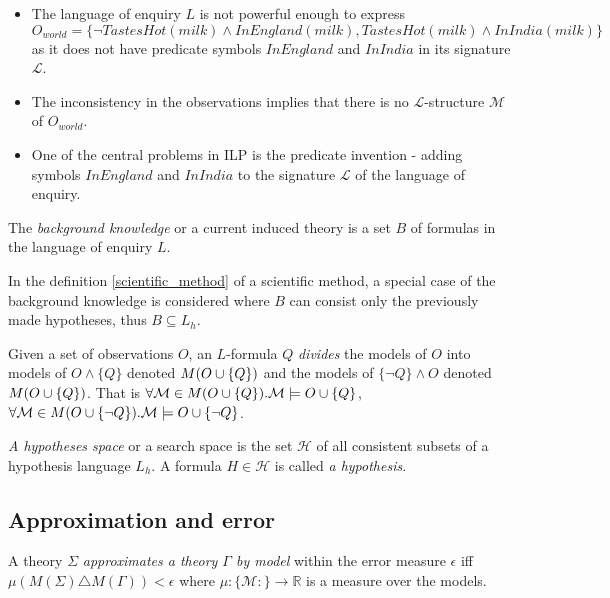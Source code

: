 \begin{remark}
\begin{itemize}
\item The language of enquiry $L$ is not powerful enough to express $O_{world}=\{\neg TastesHot(milk) \land InEngland(milk), TastesHot(milk) \land InIndia(milk)\}$
 as it does not have predicate symbols $InEngland$ and $InIndia$ in its signature $\mathcal{L}$.
\item The inconsistency in the observations implies that there is no $\mathcal{L}$-structure $\mathcal{M}$ of $O_{world}$.
\item One of the central problems in ILP is the predicate invention - adding symbols $InEngland$ and $InIndia$ to the signature $\mathcal{L}$ of the language of enquiry.
\end{itemize}
\end{remark}

\begin{defn}
The \emph{background knowledge} or a current induced theory is a set $B$ of formulas in the language of enquiry $L$.
\end{defn}

\begin{remark}
In the definition \ref{scientific_method} of a scientific method, a special case of the background knowledge is considered where $B$ can consist only the previously made hypotheses, thus $B \subseteq L_h$.
\end{remark}

\begin{note}
Given a set of observations $O$, an $L$-formula $Q$ \emph{divides} the models of $O$ into models of $O \wedge \{Q\}$ denoted $M(O \cup \{Q\})$ and the models of $\{\neg Q\} \wedge O$ denoted $M(O \cup \{Q\})$. That is $\forall \mathcal{M} \in M(O \cup \{Q\}). \mathcal{M} \models O \cup \{Q\}$,
$\forall \mathcal{M} \in M(O \cup \{\neg Q\}). \mathcal{M} \models O \cup \{\neg Q\}$.
\end{note}

\begin{defn}
\emph{A hypotheses space} or a search space is the set $\mathcal{H}$ of all consistent subsets of a hypothesis language $L_h$. A formula $H \in \mathcal{H}$ is called \emph{a hypothesis}.
\end{defn}

\subsection{Approximation and error}
\begin{defn}
A theory $\Sigma$ \emph{approximates a theory $\Gamma$ by model} within the error measure $\epsilon$ iff $\mu(M(\Sigma) \triangle M(\Gamma)) < \epsilon$ where $\mu:\{\mathcal{M}:\}\to \mathbb{R}$ is a measure over the models.
\end{defn}

